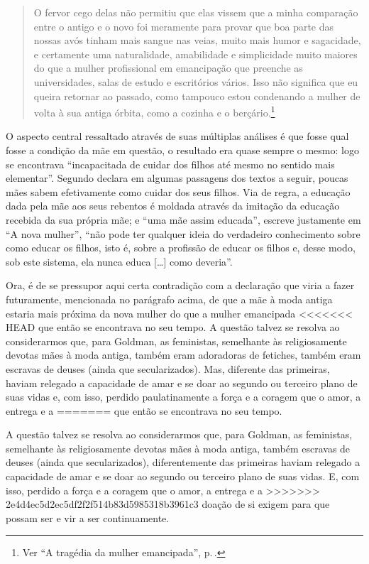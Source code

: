 \begin{quote}
O fervor cego delas não permitiu que elas vissem que a
minha comparação entre o antigo e o novo foi meramente para provar que
boa parte das nossas avós tinham mais sangue nas veias, muito mais humor
e sagacidade, e certamente uma naturalidade, amabilidade e simplicidade
muito maiores do que a mulher profissional em emancipação que preenche
as universidades, salas de estudo e escritórios vários. Isso não
significa que eu queira retornar ao passado, como tampouco estou condenando a mulher de volta à sua antiga órbita, como a cozinha e o berçário.\footnote{Ver ``A tragédia da mulher emancipada'', p.\,\pageref{mae}.}
\end{quote}

O aspecto central ressaltado através de suas múltiplas análises é que
fosse qual fosse a condição da mãe em questão, o resultado era quase
sempre o mesmo: logo se encontrava ``incapacitada de cuidar dos filhos
até mesmo no sentido mais elementar''. Segundo declara em algumas
passagens dos textos a seguir, poucas mães sabem efetivamente como
cuidar dos seus filhos. Via de regra, a educação dada pela mãe aos seus
rebentos é moldada através da imitação da educação recebida da sua
própria mãe; e ``uma mãe assim educada'', escreve justamente em ``A nova
mulher'', ``não pode ter qualquer ideia do verdadeiro conhecimento sobre
como educar os filhos, isto é, sobre a profissão de educar os filhos e,
desse modo, sob este sistema, ela nunca educa {[}\ldots{]} como deveria''.

Ora, é de se pressupor aqui certa contradição com a declaração que viria
a fazer futuramente, mencionada no parágrafo acima, de que a mãe à moda
antiga estaria mais próxima da nova mulher do que a mulher emancipada
<<<<<<< HEAD
que então se encontrava no seu tempo. A questão talvez se resolva ao
considerarmos que, para Goldman, as feministas, semelhante às
religiosamente devotas mães à moda antiga, também eram adoradoras de
fetiches, também eram escravas de deuses (ainda que secularizados). Mas,
diferente das primeiras, haviam relegado a capacidade de
amar e se doar ao segundo ou terceiro plano de suas vidas e, com isso,
perdido paulatinamente a força e a coragem que o amor, a entrega e a
=======
que então se encontrava no seu tempo. 

A questão talvez se resolva ao considerarmos que, para Goldman, as feministas, semelhante às
religiosamente devotas mães à moda antiga, também escravas de deuses (ainda que secularizados), diferentemente das primeiras haviam relegado a capacidade de
amar e se doar ao segundo ou terceiro plano de suas vidas. E, com isso,
perdido a força e a coragem que o amor, a entrega e a
>>>>>>> 2e4d4ec5d2ec5df2f2f514b83d5985318b3961c3
doação de si exigem para que possam ser e vir a ser continuamente.

